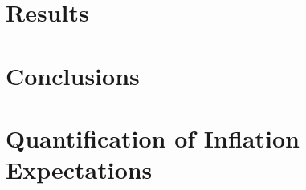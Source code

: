\documentclass[review]{elsarticle}
\begin{document}
\section{Results}\label{sec:Results}



\section{Conclusions} \label{sec:Conclusions}




\newpage

\appendix

\section{Quantification of Inflation Expectations}\label{sec:Quantification_of_Inflation_Expectations}
\end{document}
